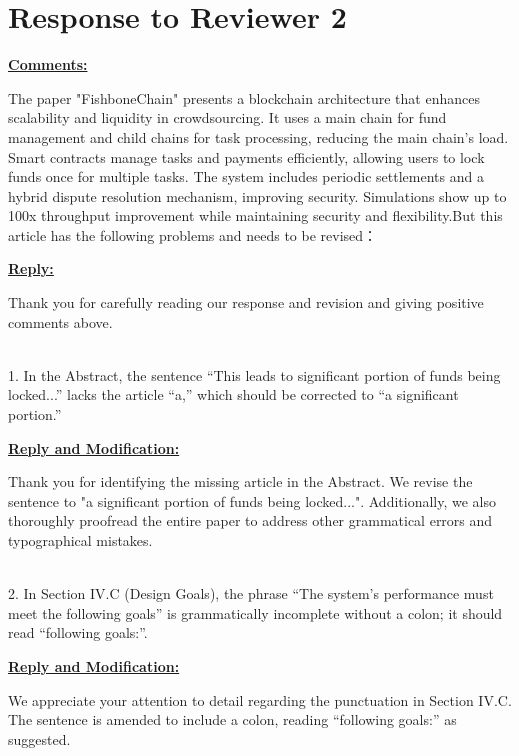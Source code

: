 \section*{Response to Reviewer 2}\label{par:r2}

{\large

\noindent \underline{\textbf{Comments:}}

The paper "FishboneChain" presents a blockchain architecture that enhances scalability and liquidity in crowdsourcing. It uses a main chain for fund management and child chains for task processing, reducing the main chain’s load. Smart contracts manage tasks and payments efficiently, allowing users to lock funds once for multiple tasks. The system includes periodic settlements and a hybrid dispute resolution mechanism, improving security. Simulations show up to 100x throughput improvement while maintaining security and flexibility.But this article has the following problems and needs to be revised：

{\color{blue}
\noindent \underline{\textbf{Reply:}}

Thank you for carefully reading our response and revision and giving positive comments above.
}\\ %

1. In the Abstract, the sentence ``This leads to significant portion of funds being locked...'' lacks the article ``a,'' which should be corrected to ``a significant portion.''

{\color{blue}
\noindent \underline{\textbf{Reply and Modification:}}

Thank you for identifying the missing article in the Abstract. We revise the sentence to "a significant portion of funds being locked...". Additionally, we also thoroughly proofread the entire paper to address other grammatical errors and typographical mistakes.
}\\ %

2. In Section IV.C (Design Goals), the phrase ``The system’s performance must meet the following goals'' is grammatically incomplete without a colon; it should read ``following goals:''.

{\color{blue}
\noindent \underline{\textbf{Reply and Modification:}}

We appreciate your attention to detail regarding the punctuation in Section IV.C. The sentence is amended to include a colon, reading ``following goals:'' as suggested.
}\\ %

}
